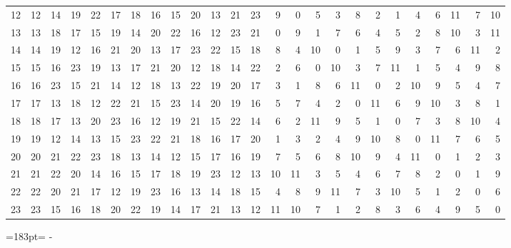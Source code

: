 \documentclass[10pt,a4paper]{article}
\newcommand{\needspace}[1]{\par\penalty-100\begingroup\dimen0=#1\relax\dimen2=\pagegoal
  \advance\dimen2-\pagetotal\ifdim\dimen0>\dimen2\relax\ifdim\dimen2>0pt\vfil\break\fi\fi
  \endgroup}
\numberwithin{equation}{section}
\begin{document}
{\begin{longtable}{@{}r|rrrrrrrrrrrrrrrrrrrrrrrr@{}}
12 & 12 & 14 & 19 & 22 & 17 & 18 & 16 & 15 & 20 & 13 & 21 & 23 & 9 & 0 & 5 & 3 & 8 & 2 & 1 & 4 & 6 & 11 & 7 & 10\\
13 & 13 & 18 & 17 & 15 & 19 & 14 & 20 & 22 & 16 & 12 & 23 & 21 & 0 & 9 & 1 & 7 & 6 & 4 & 5 & 2 & 8 & 10 & 3 & 11\\
14 & 14 & 19 & 12 & 16 & 21 & 20 & 13 & 17 & 23 & 22 & 15 & 18 & 8 & 4 & 10 & 0 & 1 & 5 & 9 & 3 & 7 & 6 & 11 & 2\\
15 & 15 & 16 & 23 & 19 & 13 & 17 & 21 & 20 & 12 & 18 & 14 & 22 & 2 & 6 & 0 & 10 & 3 & 7 & 11 & 1 & 5 & 4 & 9 & 8\\
16 & 16 & 23 & 15 & 21 & 14 & 12 & 18 & 13 & 22 & 19 & 20 & 17 & 3 & 1 & 8 & 6 & 11 & 0 & 2 & 10 & 9 & 5 & 4 & 7\\
17 & 17 & 13 & 18 & 12 & 22 & 21 & 15 & 23 & 14 & 20 & 19 & 16 & 5 & 7 & 4 & 2 & 0 & 11 & 6 & 9 & 10 & 3 & 8 & 1\\
18 & 18 & 17 & 13 & 20 & 23 & 16 & 12 & 19 & 21 & 15 & 22 & 14 & 6 & 2 & 11 & 9 & 5 & 1 & 0 & 7 & 3 & 8 & 10 & 4\\
19 & 19 & 12 & 14 & 13 & 15 & 23 & 22 & 21 & 18 & 16 & 17 & 20 & 1 & 3 & 2 & 4 & 9 & 10 & 8 & 0 & 11 & 7 & 6 & 5\\
20 & 20 & 21 & 22 & 23 & 18 & 13 & 14 & 12 & 15 & 17 & 16 & 19 & 7 & 5 & 6 & 8 & 10 & 9 & 4 & 11 & 0 & 1 & 2 & 3\\
21 & 21 & 22 & 20 & 14 & 16 & 15 & 17 & 18 & 19 & 23 & 12 & 13 & 10 & 11 & 3 & 5 & 4 & 6 & 7 & 8 & 2 & 0 & 1 & 9\\
22 & 22 & 20 & 21 & 17 & 12 & 19 & 23 & 16 & 13 & 14 & 18 & 15 & 4 & 8 & 9 & 11 & 7 & 3 & 10 & 5 & 1 & 2 & 0 & 6\\*
23 & 23 & 15 & 16 & 18 & 20 & 22 & 19 & 14 & 17 & 21 & 13 & 12 & 11 & 10 & 7 & 1 & 2 & 8 & 3 & 6 & 4 & 9 & 5 & 0\\
\bottomrule\end{longtable}}
\needspace{183pt}
\end{document}
